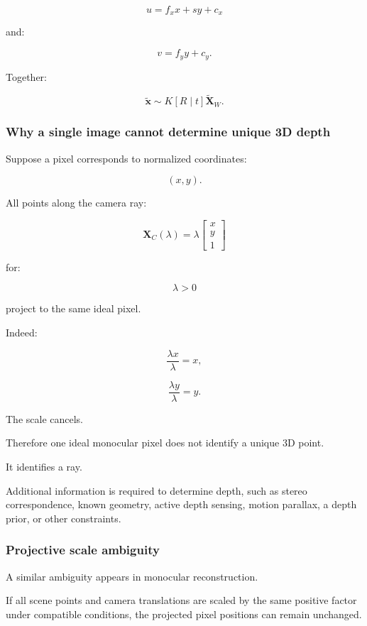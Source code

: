 \[
 \boxed{ u=f_xx+sy+c_x }
\]

and:

\[
 \boxed{ v=f_yy+c_y }.
\]

Together:

\[
 \boxed{ \tilde{\mathbf x} \sim K[R\mid t]\tilde{\mathbf X}_W }.
\]

\subsubsection{Why a single image cannot determine unique 3D depth}\label{why-a-single-image-cannot-determine-unique-3d-depth}

Suppose a pixel corresponds to normalized coordinates:

\[
 (x,y).
\]

All points along the camera ray:

\[
 \boxed{ \mathbf X_C(\lambda)= \lambda \begin{bmatrix} x\\y\\1 \end{bmatrix} }
\]

for:

\[
 \lambda>0
\]

project to the same ideal pixel.

Indeed:

\[
 \frac{\lambda x}{\lambda}=x,
\]

\[
 \frac{\lambda y}{\lambda}=y.
\]

The scale cancels.

Therefore one ideal monocular pixel does not identify a unique 3D point.

It identifies a ray.

Additional information is required to determine depth, such as stereo correspondence, known geometry, active depth sensing, motion parallax, a depth prior, or other constraints.

\subsubsection{Projective scale ambiguity}\label{projective-scale-ambiguity}

A similar ambiguity appears in monocular reconstruction.

If all scene points and camera translations are scaled by the same positive factor under compatible conditions, the projected pixel positions can remain unchanged.


